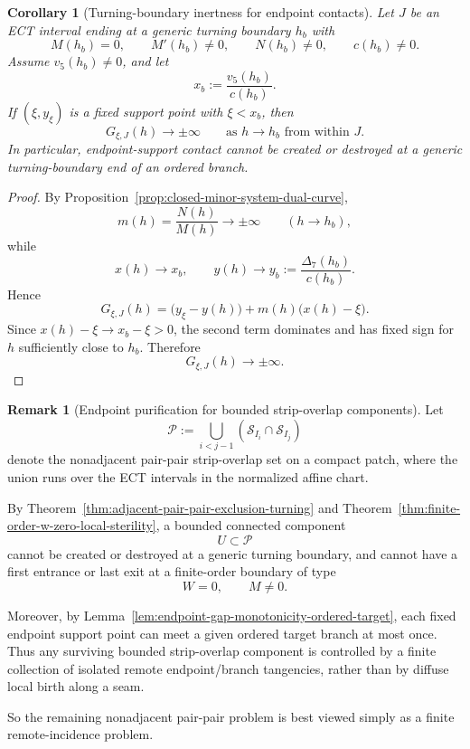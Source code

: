 \documentclass[11pt,a4paper]{amsart}
\theoremstyle{plain}
\newtheorem{corollary}[theorem]{Corollary}
\theoremstyle{definition}
\newtheorem{remark}[theorem]{Remark}
\begin{document}
\begin{corollary}[Turning-boundary inertness for endpoint contacts]
\label{cor:turning-boundary-inertness-endpoint-contacts}
Let $J$ be an ECT interval ending at a generic turning boundary $h_b$ with
\[
M(h_b)=0,
\qquad
M'(h_b)\neq 0,
\qquad
N(h_b)\neq 0,
\qquad
c(h_b)\neq 0.
\]
Assume $v_5(h_b)\neq 0$, and let
\[
x_b:=\frac{v_5(h_b)}{c(h_b)}.
\]
If $(\xi,y_\xi)$ is a fixed support point with $\xi<x_b$, then
\[
G_{\xi,J}(h)\to \pm\infty
\qquad\text{as } h\to h_b \text{ from within } J.
\]
In particular, endpoint-support contact cannot be created or destroyed at a
generic turning-boundary end of an ordered branch.
\end{corollary}

\begin{proof}
By Proposition~\ref{prop:closed-minor-system-dual-curve},
\[
m(h)=\frac{N(h)}{M(h)}\to \pm\infty
\qquad (h\to h_b),
\]
while
\[
x(h)\to x_b,
\qquad
y(h)\to y_b:=\frac{\Delta_7(h_b)}{c(h_b)}.
\]
Hence
\[
G_{\xi,J}(h)
=
\bigl(y_\xi-y(h)\bigr)+m(h)\bigl(x(h)-\xi\bigr).
\]
Since $x(h)-\xi\to x_b-\xi>0$, the second term dominates and has fixed sign
for $h$ sufficiently close to $h_b$. Therefore
\[
G_{\xi,J}(h)\to \pm\infty.
\]
\end{proof}

\begin{remark}[Endpoint purification for bounded strip-overlap components]
\label{rem:endpoint-purification-bounded-strip-overlap}
Let
\[
\mathcal P
:=
\bigcup_{i<j-1}(\mathcal S_{I_i}\cap \mathcal S_{I_j})
\]
denote the nonadjacent pair-pair strip-overlap set on a compact patch, where
the union runs over the ECT intervals in the normalized affine chart.

By Theorem~\ref{thm:adjacent-pair-pair-exclusion-turning} and
Theorem~\ref{thm:finite-order-w-zero-local-sterility}, a bounded connected
component
\[
U\subset \mathcal P
\]
cannot be created or destroyed at a generic turning boundary, and cannot have a
first entrance or last exit at a finite-order boundary of type
\[
W=0,\qquad M\neq 0.
\]

Moreover, by
Lemma~\ref{lem:endpoint-gap-monotonicity-ordered-target}, each fixed endpoint
support point can meet a given ordered target branch at most once. Thus any
surviving bounded strip-overlap component is controlled by a finite collection
of isolated remote endpoint/branch tangencies, rather than by diffuse local
birth along a seam.

So the remaining nonadjacent pair-pair problem is best viewed simply as a
finite remote-incidence problem.
\end{remark}
\end{document}
